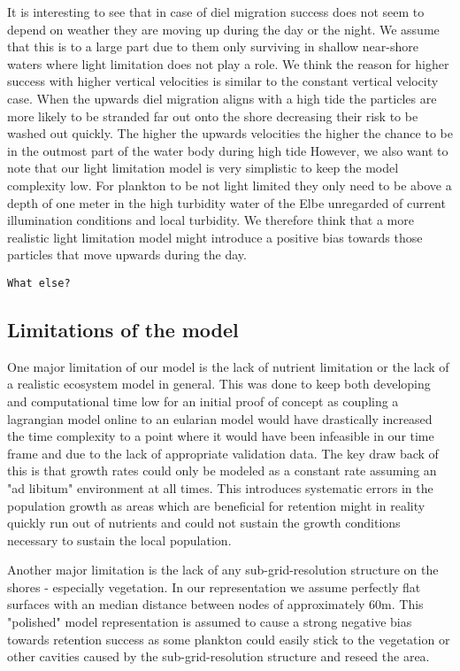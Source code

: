 It is interesting to see that in case of diel migration success does not seem to depend on weather they are moving up during the day or the night.
We assume that this is to a large part due to them only surviving in shallow near-shore waters where light limitation does not play a role.
We think the reason for higher success with higher vertical velocities is similar to the constant vertical velocity case.
When the upwards diel migration aligns with a high tide the particles are more likely to be stranded far out onto the shore decreasing their risk to be washed out quickly.
The higher the upwards velocities the higher the chance to be in the outmost part of the water body during high tide
However, we also want to note that our light limitation model is very simplistic to keep the model complexity low.
For plankton to be not light limited they only need to be above a depth of one meter in the high turbidity water of the Elbe unregarded of current illumination conditions and local turbidity.
We therefore think that a more realistic light limitation model might introduce a positive bias towards those particles that move upwards during the day.

\texttt{What else?}

\subsection*{Limitations of the model}

One major limitation of our model is the lack of nutrient limitation or the lack of a realistic ecosystem model in general.
This was done to keep both developing and computational time low for an initial proof of concept as coupling a lagrangian model online to an eularian model would have drastically increased the time complexity to a point where it would have been infeasible in our time frame and due to the lack of appropriate validation data.
The key draw back of this is that growth rates could only be modeled as a constant rate assuming an "ad libitum" environment at all times.
This introduces systematic errors in the population growth as areas which are beneficial for retention might in reality quickly run out of nutrients and could not sustain the growth conditions necessary to sustain the local population.

Another major limitation is the lack of any sub-grid-resolution structure on the shores - especially vegetation.
In our representation we assume perfectly flat surfaces with an median distance between nodes of approximately 60m.
This "polished" model representation is assumed to cause a strong negative bias towards retention success as some plankton could easily stick to the vegetation or other cavities caused by the sub-grid-resolution structure and reseed the area.

